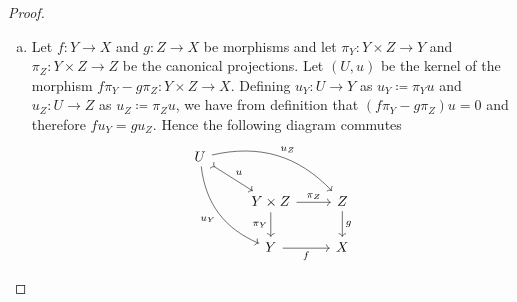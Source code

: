 \begin{proof}
    \begin{enumerate}[(a)]\setlength\itemsep{0em}
        \item Let \(f: Y \to X\) and \(g: Z \to X\) be morphisms and let
              \(\pi_Y: Y \times Z \to Y\) and \(\pi_Z: Y \times Z \to Z\) be the canonical projections. Let
              \((U, u)\) be the kernel of the morphism
              \(f \pi_Y - g \pi_Z: Y \times Z \to X\). Defining \(u_Y: U \to Y\) as
              \(u_Y \coloneq \pi_Y u\) and \(u_Z: U \to Z\) as \(u_Z \coloneq \pi_Z u\), we have from definition
              that \((f \pi_Y - g \pi_Z) u = 0\) and therefore \(f u_Y = g u_Z\). Hence the
              following diagram commutes
              \[
                  \begin{tikzcd}
                      U \ar[rrd, "u_Z", bend left]
                      \ar[ddr, "u_Y"', bend right]
                      \ar[rd, "u", tail]
                      & &
                      \\
                      &Y \times Z \ar[r, "\pi_Z"] \ar[d, "\pi_Y"']
                      &Z \ar[d, "g"]
                      \\
                      &Y \ar[r, "f"']
                      &X
                  \end{tikzcd}
              \]


\end{enumerate}
\end{proof}

